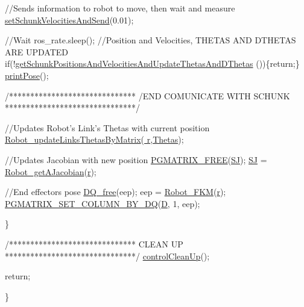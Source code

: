 \begin{DoxyCode}
                \textcolor{comment}{//Sends information to robot to move, then wait and measure}
                \hyperlink{classCartesian__controller_a40d17a9794af8a9a607618bf0ee5efff}{setSchunkVelocitiesAndSend}(0.01);

                \textcolor{comment}{//Wait}
                ros\_rate.sleep();
                \textcolor{comment}{//Position and Velocities, THETAS AND DTHETAS ARE UPDATED}
                \textcolor{keywordflow}{if}(!\hyperlink{classCartesian__controller_a0d7a63bac84715f6742db738df246f91}{getSchunkPositionsAndVelocitiesAndUpdateThetasAndDThetas}
      ())\{\textcolor{keywordflow}{return};\}
                \hyperlink{classCartesian__pose__controller_ab55ab40074c82ba8cc010fe68fc76d5b}{printPose}();

                \textcolor{comment}{/******************************}
\textcolor{comment}{                /END    COMUNICATE WITH SCHUNK}
\textcolor{comment}{                *******************************/}

                \textcolor{comment}{//Updates Robot's Link's Thetas with current position}
                \hyperlink{robot_8h_aa1d3aca5132bd5f347f5966d38fbb966}{Robot\_updateLinksThetasByMatrix}(\hyperlink{classCartesian__controller_a5562129951bd802e4ded77fc716c87a0}{
      r},\hyperlink{classCartesian__controller_a0a0f818dad601cd9e3e26cb6959b8eb6}{Thetas});

                \textcolor{comment}{//Updates Jacobian with new position}
                \hyperlink{gmatrix_8h_a9a73b4e0a77f386c0bae1bba75298d1d}{PGMATRIX\_FREE}(\hyperlink{classCartesian__controller_a98fdac06d136ac3dba0102d97cd5dd36}{SJ});
                \hyperlink{classCartesian__controller_a98fdac06d136ac3dba0102d97cd5dd36}{SJ}  = \hyperlink{robot_8h_ab6dd42296709cf38d3468af7afd29563}{Robot\_getAJacobian}(\hyperlink{classCartesian__controller_a5562129951bd802e4ded77fc716c87a0}{r});

                \textcolor{comment}{//End effectors pose}
                \hyperlink{dualquaternion_8h_a1d21b6cb665c04de4be5aca50804caf4}{DQ\_free}(eep);
                eep = \hyperlink{robot_8h_a57cc252fbb9e4c8be955b6af755b0c2c}{Robot\_FKM}(\hyperlink{classCartesian__controller_a5562129951bd802e4ded77fc716c87a0}{r});
                \hyperlink{dualquaternion_8h_a3d48348c3e25d1724058c2cf2364e42e}{PGMATRIX\_SET\_COLUMN\_BY\_DQ}(\hyperlink{classCartesian__controller_a8c470b652ce436d8e48f126073fc2593}{D}, 1, eep);

        \}


        \textcolor{comment}{/******************************}
\textcolor{comment}{                        CLEAN UP}
\textcolor{comment}{        *******************************/}
        \hyperlink{classCartesian__controller_a8c0f0b41de9f4f8b2e3aa327e7c6b50c}{controlCleanUp}();

        \textcolor{keywordflow}{return};

\}
\end{DoxyCode}


